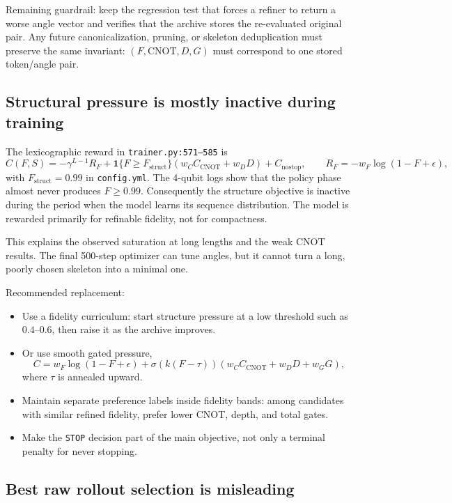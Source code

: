 \documentclass[11pt]{article}
\begin{document}
Remaining guardrail: keep the regression test that forces a refiner to return a
worse angle vector and verifies that the archive stores the re-evaluated
original pair.  Any future canonicalization, pruning, or skeleton deduplication
must preserve the same invariant: \((F,\mathrm{CNOT},D,G)\) must correspond to
one stored token/angle pair.

\subsection{Structural pressure is mostly inactive during training}

The lexicographic reward in \texttt{trainer.py:571--585} is
\[
  C(F,S) =
  -\gamma^{L-1} R_F
  + \mathbf{1}\{F \ge F_{\mathrm{struct}}\}
  (w_C C_{\mathrm{CNOT}} + w_D D)
  + C_{\mathrm{nostop}},
  \qquad
  R_F = -w_F \log(1-F+\epsilon),
\]
with \(F_{\mathrm{struct}}=0.99\) in \texttt{config.yml}.  The 4-qubit
logs show that the policy phase almost never produces \(F \ge 0.99\).
Consequently the structure objective is inactive during the period when the
model learns its sequence distribution.  The model is rewarded primarily for
refinable fidelity, not for compactness.

This explains the observed saturation at long lengths and the weak CNOT results.
The final 500-step optimizer can tune angles, but it cannot turn a long, poorly
chosen skeleton into a minimal one.

Recommended replacement:
\begin{itemize}
  \item Use a fidelity curriculum: start structure pressure at a low threshold
  such as \(0.4\)--\(0.6\), then raise it as the archive improves.
  \item Or use smooth gated pressure,
  \[
    C = w_F \log(1-F+\epsilon)
      + \sigma(k(F-\tau)) (w_C C_{\mathrm{CNOT}} + w_D D + w_G G),
  \]
  where \(\tau\) is annealed upward.
  \item Maintain separate preference labels inside fidelity bands:
  among candidates with similar refined fidelity, prefer lower CNOT, depth, and
  total gates.
  \item Make the \texttt{STOP} decision part of the main objective, not only a
  terminal penalty for never stopping.
\end{itemize}

\subsection{Best raw rollout selection is misleading}
\end{document}
